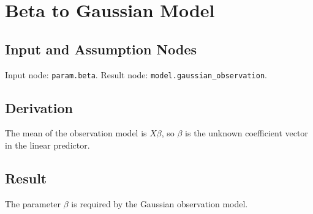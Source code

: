 \section{Beta to Gaussian Model}
\label{edge:beta-to-gaussian-model}

\subsection{Input and Assumption Nodes}
Input node: \texttt{param.beta}. Result node: \texttt{model.gaussian\_observation}.

\subsection{Derivation}
The mean of the observation model is \(X\beta\), so \(\beta\) is the unknown coefficient vector in the linear predictor.

\subsection{Result}
The parameter \(\beta\) is required by the Gaussian observation model.

